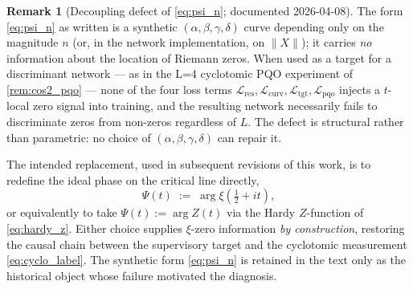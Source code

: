 \documentclass[11pt, a4paper]{article}
\theoremstyle{definition}
\newtheorem{remark}{Remark}[section]
\theoremstyle{plain}
\newcommand{\xif}{\xi}                      %
\newcommand{\Psip}{\Psi}                    %
\begin{document}
\begin{remark}[Decoupling defect of \cref{eq:psi_n};
documented 2026-04-08]
\label{rem:psi_defect}
The form \cref{eq:psi_n} as written is a synthetic
$(\alpha,\beta,\gamma,\delta)$ curve depending only on the magnitude
$n$ (or, in the network implementation, on $\|X\|$); it carries
\emph{no} information about the location of Riemann zeros. When used
as a target for a discriminant network — as in the L=4 cyclotomic PQO
experiment of \cref{rem:cos2_pqo} — none of the four loss terms
$\mathcal{L}_{\mathrm{res}},\mathcal{L}_{\mathrm{curv}},\mathcal{L}_{\mathrm{tgt}},
\mathcal{L}_{\mathrm{pqo}}$ injects a $t$-local zero signal into training,
and the resulting network necessarily fails to discriminate zeros from
non-zeros regardless of $L$. The defect is structural rather than
parametric: no choice of $(\alpha,\beta,\gamma,\delta)$ can repair it.

\smallskip
The intended replacement, used in subsequent revisions of this work,
is to redefine the ideal phase on the critical line directly,
\begin{equation}
  \Psip(t) \;:=\; \arg \xif(\tfrac{1}{2}+it),
  \label{eq:psi_supervised}
\end{equation}
or equivalently to take $\Psip(t) := \arg Z(t)$ via the Hardy
$Z$-function of \cref{eq:hardy_z}. Either choice supplies $\xif$-zero
information \emph{by construction}, restoring the causal chain between
the supervisory target and the cyclotomic measurement
\cref{eq:cyclo_label}. The synthetic form \cref{eq:psi_n} is retained
in the text only as the historical object whose failure motivated the
diagnosis.


\end{remark}
\end{document}
